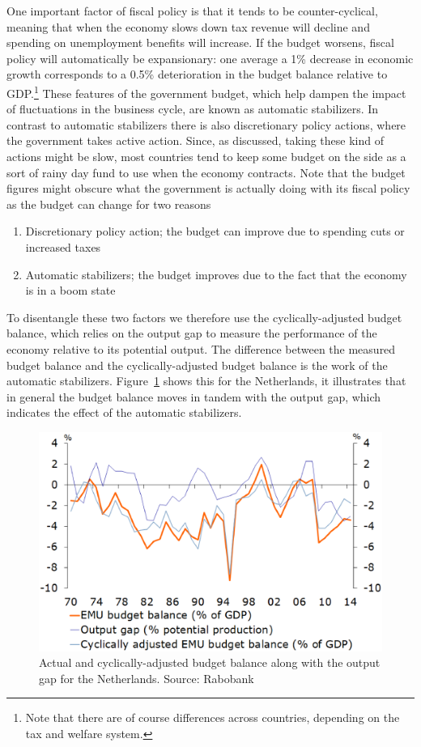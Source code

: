 \documentclass{tufte-handout}
\begin{document}
One important factor of fiscal policy is that it tends to be counter-cyclical, meaning that when the economy slows down tax revenue will decline and spending on unemployment benefits will increase. 
If the budget worsens, fiscal policy will automatically be expansionary: one average a 1\% decrease in economic growth corresponds to a 0.5\% deterioration in the budget balance relative to GDP.\footnote{Note that there are of course differences across countries, depending on the tax and welfare system.} 
These features of the government budget, which help dampen the impact of fluctuations in the business cycle, are known as automatic stabilizers. 
In contrast to automatic stabilizers there is also discretionary policy actions, where the government takes active action. 
Since, as discussed, taking these kind of actions might be slow, most countries tend to keep some budget on the side as a sort of rainy day fund to use when the economy contracts. 
Note that the budget figures might obscure what the government is actually doing with its fiscal policy as the budget can change for two reasons
\begin{enumerate}
  \item Discretionary policy action; the budget can improve due to spending cuts or increased taxes
  \item Automatic stabilizers; the budget improves due to the fact that the economy is in a boom state
\end{enumerate}

To disentangle these two factors we therefore use the cyclically-adjusted budget balance, which relies on the output gap to measure the performance of the economy relative to its potential output. 
The difference between the measured budget balance and the cyclically-adjusted budget balance is the work of the automatic stabilizers. 
Figure~\ref{fig:rabo} shows this for the Netherlands, it illustrates that in general the budget balance moves in tandem with the output gap, which indicates the effect of the automatic stabilizers. 

\begin{figure}
  \includegraphics[scale=.3]{nl_budget}
  \caption{Actual and cyclically-adjusted budget balance along with the output gap for the Netherlands. Source: Rabobank}
  \label{fig:rabo}
\end{figure}
\end{document}
